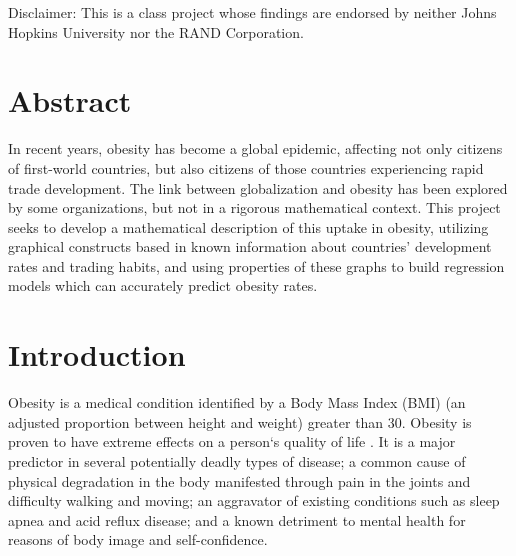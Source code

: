 \documentclass[oneside,12pt]{report}
\def\prefacesection#1{
\chapter*{#1}
\addcontentsline{toc}{chapter}{#1}
}
\begin{document}
\vfill  %
\footnoterule
\noindent \small{Disclaimer: This is a class project whose findings are endorsed by neither Johns Hopkins University nor the RAND Corporation.}

\prefacesection{Abstract}

In recent years, obesity has become a global epidemic, affecting not only citizens of first-world countries, but also citizens of those countries experiencing rapid trade development. The link between globalization and obesity has been explored by some organizations, but not in a rigorous mathematical context. This project seeks to develop a mathematical description of this uptake in obesity, utilizing graphical constructs based in known information about countries’ development rates and trading habits, and using properties of these graphs to build regression models which can accurately predict obesity rates.


\tableofcontents

\listoffigures



\renewcommand{\thefootnote}{\arabic{footnote}}
\setcounter{footnote}{0}

%
%
%
%
%
%

%
%
%
%
%
%

\chapter{Introduction}

Obesity is a medical condition identified by a Body Mass Index (BMI) (an adjusted proportion between height and weight) greater than 30. Obesity is proven to have extreme effects on a person`s quality of life \cite{health}. It is a major predictor in several potentially deadly types of disease; a common cause of physical degradation in the body manifested through pain in the joints and difficulty walking and moving; an aggravator of existing conditions such as sleep apnea and acid reflux disease; and a known detriment to mental health for reasons of body image and self-confidence.
\end{document}
